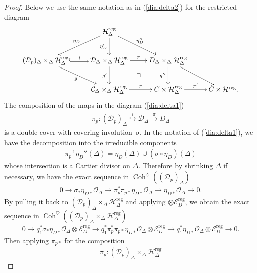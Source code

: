 \documentclass[11pt,oneside,a4paper,mathscr]{amsart}
\makeatletter
\theoremstyle{definition}
\newcommand{\cH}{\mathcal{H}}
\newcommand{\cC}{\mathcal{C}}
\newcommand{\cE}{\mathcal{E}}
\newcommand{\cD}{\mathcal{D}}
\newcommand{\diasquare}{\ar@{}[rd]|\square}
\newcommand{\Coh}{\operatorname{Coh}}
\newcommand{\inclusion}{\ar@<-0.3ex>@{^{(}->}[r]}
\makeatother
\begin{document}
\begin{proof}
Below we use the same notation as in (\ref{dia:delta2}) for the 
restricted diagram 
\begin{align}\label{dia:delta3}
    \xymatrix{
& \cH_{\Delta}^{\mathrm{reg}} \ar[d]_-{\eta_D'} \ar[rd]^-{\eta_D''} \ar[ld]_-{\eta_D} & &\\
(\cD_{p})_{\Delta}\times_{\Delta}\cH_{\Delta}^{\mathrm{reg}} \inclusion^-{i} \ar[rd]_-{g} & \cD_{\Delta}\times_{\Delta}\cH_{\Delta}^{\mathrm{reg}} \ar[r]^-{\pi}\ar[d]_-{g'} \diasquare & D_{\Delta}\times_{\Delta}\cH_{\Delta}^{\mathrm{reg}}  \ar[d]_-{g''} \ar[rd] & \\
& \cC_{\Delta}\times_{\Delta}\cH_{\Delta}^{\mathrm{reg}} \ar[r]^-{\pi} & C\times \cH_{\Delta}^{\mathrm{reg}} \ar[r]^-{\pi'} &
C \times \cH^{\mathrm{reg}}.       }
\end{align}
The composition of the maps in the diagram (\ref{dia:delta1})
\begin{align*}
    \pi_p \colon (\cD_p)_{\Delta} \stackrel{i}{\hookrightarrow} \cD_{\Delta} \stackrel{\pi}{\to} D_{\Delta}
\end{align*}
is a double cover with covering involution~$\sigma$. 
In the notation of (\ref{dia:delta1}), we have the decomposition
into the irreducible components 
\begin{align*}
    \pi_p^{-1}\eta_{D}''(\Delta)=\eta_D(\Delta)\cup (\sigma\circ \eta_D)(\Delta)
\end{align*}
whose intersection is a Cartier divisor on $\Delta$. Therefore by shrinking 
$\Delta$ if necessary, we have 
the exact sequence in $\Coh^{\heartsuit}((\cD_p)_{\Delta})$
\begin{align*}
    0\to \sigma_{*}\eta_{D*}\mathcal{O}_{\Delta} \to \pi_p^* \pi_{p*}\eta_{D*}\mathcal{O}_{\Delta} \to \eta_{D*}\mathcal{O}_{\Delta} \to 0.
\end{align*}
By pulling it back to $(\cD_p)_{\Delta}\times_{\Delta}\cH_{\Delta}^{\mathrm{reg}}$
and applying $\otimes \cE^{\mathrm{reg}}_{D}$, 
we obtain the exact sequence in $\Coh^{\heartsuit}((\cD_p)_{\Delta}\times_{\Delta}\cH_{\Delta}^{\mathrm{reg}})$
\begin{align*}
     0\to q_1^*\sigma_{*}\eta_{D*}\mathcal{O}_{\Delta} \otimes \cE^{\mathrm{reg}}_{D}\to q_1^*\pi_p^* \pi_{p*}\eta_{D*}\mathcal{O}_{\Delta}\otimes \cE^{\mathrm{reg}}_{D} \to q_1^*\eta_{D*}\mathcal{O}_{\Delta}\otimes \cE^{\mathrm{reg}}_{D} \to 0. 
\end{align*}
Then applying $\pi_{p*}$ for the composition 
\begin{align*}
    \pi_p \colon (\cD_p)_{\Delta}\times_{\Delta}\cH_{\Delta}^{\mathrm{reg}}

\end{align*}
\end{proof}
\end{document}
